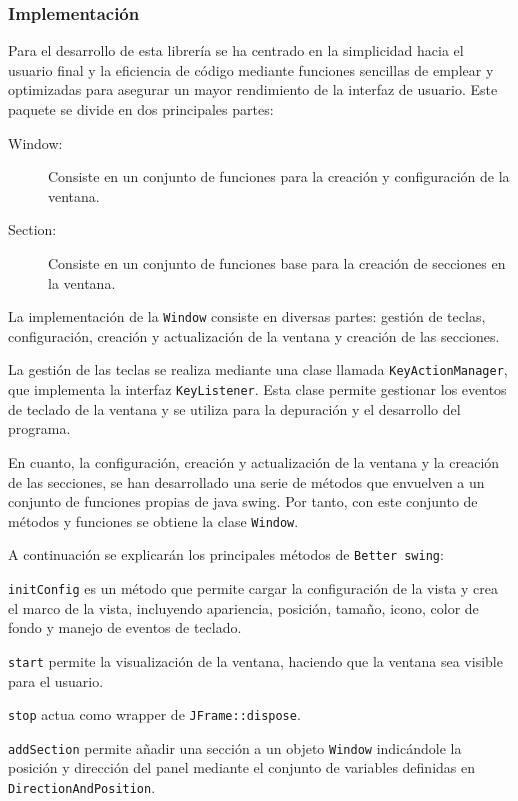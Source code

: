 \subsubsection{Implementación}

Para el desarrollo de esta librería se ha centrado en la simplicidad hacia el usuario final y la eficiencia de código mediante funciones sencillas de emplear y optimizadas para asegurar un mayor rendimiento de la interfaz de usuario. Este paquete se divide en dos principales partes:\bigskip

\begin{description}
    \item[Window:] Consiste en un conjunto de funciones para la creación y configuración de la ventana.
    \item[Section: ] Consiste en un conjunto de funciones base para la creación de secciones en la ventana.
\end{description}\bigskip

La implementación de la \texttt{Window} consiste en diversas partes: gestión de teclas, configuración, creación y actualización de la ventana y creación de las secciones.\bigskip

La gestión de las teclas se realiza mediante una clase llamada \texttt{KeyActionManager}, que implementa la interfaz \texttt{KeyListener}. Esta clase permite gestionar los eventos de teclado de la ventana y se utiliza para la depuración y el desarrollo del programa.\bigskip

En cuanto, la configuración, creación y actualización de la ventana y la creación de las secciones, se han desarrollado una serie de métodos que envuelven a un conjunto de funciones propias de java swing. Por tanto, con este conjunto de métodos y funciones se obtiene la clase \texttt{Window}.\bigskip

A continuación se explicarán los principales métodos de \texttt{Better swing}:\bigskip

\texttt{initConfig} es un método que permite cargar la configuración de la vista y crea el marco de la vista, incluyendo apariencia, posición, tamaño, icono, color de fondo y manejo de eventos de teclado. \bigskip

\texttt{start} permite la visualización de la ventana, haciendo que la ventana sea visible para el usuario.\bigskip

\texttt{stop} actua como wrapper de \texttt{JFrame::dispose}.\bigskip

\texttt{addSection} permite añadir una sección a un objeto \texttt{Window} indicándole la posición y dirección del panel mediante el conjunto de variables definidas en \texttt{DirectionAndPosition}. \bigskip

